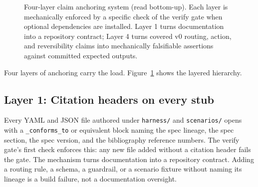 \documentclass[twocolumn,10pt,a4paper]{article}
\begin{document}
\begin{figure}[t]
\centering
{}
\caption{Four-layer claim anchoring system (read bottom-up). Each layer is mechanically enforced by a specific check of the verify gate when optional dependencies are installed. Layer 1 turns documentation into a repository contract; Layer 4 turns covered v0 routing, action, and reversibility claims into mechanically falsifiable assertions against committed expected outputs.}
\label{fig:fourlayer}
\end{figure}

Four layers of anchoring carry the load. Figure~\ref{fig:fourlayer} shows the layered hierarchy.

\subsection{Layer 1: Citation headers on every stub}

Every YAML and JSON file authored under \texttt{harness/} and \texttt{scenarios/} opens with a \texttt{\_conforms\_to} or equivalent block naming the spec lineage, the spec section, the spec version, and the bibliography reference numbers. The verify gate's first check enforces this: any new file added without a citation header fails the gate. The mechanism turns documentation into a repository contract. Adding a routing rule, a schema, a guardrail, or a scenario fixture without naming its lineage is a build failure, not a documentation oversight.
\end{document}
